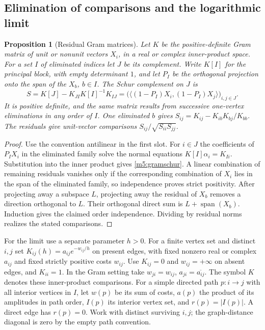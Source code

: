 \documentclass[11pt,reqno]{amsart}
\newtheorem{proposition}[theorem]{Proposition}
\theoremstyle{definition}
\theoremstyle{remark}
\numberwithin{equation}{section}
\begin{document}
\subsection{Elimination of comparisons and the logarithmic limit}

\begin{proposition}[Residual Gram matrices]\label{m5:projection}
Let \(K\) be the positive-definite Gram matrix of unit or nonunit vectors
\(X_i\), in a real or complex inner-product space. For a set \(I\) of
eliminated indices let \(J\) be its complement. Write \(K[I]\) for the
principal block, with empty determinant \(1\), and let \(P_I\) be the
orthogonal projection onto the span of the \(X_b\), \(b\in I\).
The Schur complement on \(J\) is
\begin{equation}\label{m5:gramschur}
 S=K[J]-K_{JI}K[I]^{-1}K_{IJ}
   =\bigl(\langle(1-P_I)X_i,(1-P_I)X_j\rangle\bigr)_{i,j\in J}.
\end{equation}
It is positive definite, and the same matrix results from successive
one-vertex eliminations in any order of \(I\). One eliminated \(b\)
gives \(S_{ij}=K_{ij}-K_{ib}K_{bj}/K_{bb}\). The residuals give
unit-vector comparisons \(S_{ij}/\sqrt{S_{ii}S_{jj}}\).
\end{proposition}
\begin{proof}
Use the convention antilinear in the first slot. For \(i\in J\) the
coefficients of \(P_I X_i\) in the eliminated family solve the normal
equations \(K[I]\alpha_i=K_{Ii}\). Substitution into the inner product
gives \eqref{m5:gramschur}. A linear combination of remaining
residuals vanishes only if the corresponding combination of \(X_i\)
lies in the span of the eliminated family, so independence proves
strict positivity. After projecting away a subspace \(L\), projecting
away the residual of \(X_b\) removes a direction orthogonal to \(L\).
Their orthogonal direct sum is \(L+\operatorname{span}(X_b)\).
Induction gives the claimed order independence. Dividing by residual
norms realizes the stated comparisons.
\end{proof}

For the limit use a separate parameter \(h>0\). For a finite vertex set
and distinct \(i,j\) set \(K_{ij}(h)=a_{ij}e^{-w_{ij}/h}\) on present edges,
with fixed nonzero real or complex \(a_{ij}\) and fixed strictly positive
costs \(w_{ij}\). Use \(K_{ij}=0\) and \(w_{ij}=+\infty\) on absent edges,
and \(K_{ii}=1\). In the Gram setting take
\(w_{ji}=w_{ij}\), \(a_{ji}=\overline{a_{ij}}\). The symbol \(K\)
denotes these inner-product comparisons. For a simple directed path
\(p:i\to j\) with all interior vertices in \(I\), let \(w(p)\) be its
sum of costs, \(a(p)\) the product of its amplitudes in path order,
\(I(p)\) its interior vertex set, and \(r(p)=|I(p)|\). A direct edge has
\(r(p)=0\). Work with distinct surviving \(i,j\); the graph-distance
diagonal is zero by the empty path convention.
\end{document}
